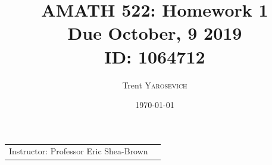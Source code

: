 \documentclass{article}
\title{AMATH 522: Homework 1 \\Due October, 9 2019 \\ ID: 1064712} %
\author{Trent \textsc{Yarosevich}} %
\date{\today} %
\begin{document}
\maketitle %
\setlength\parindent{1cm}

\begin{center}
\begin{tabular}{l r}
Instructor: Professor Eric Shea-Brown %
\end{tabular}
\end{center}
\doublespacing

\end{document}
